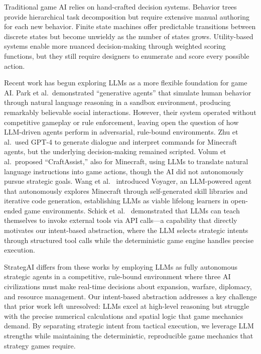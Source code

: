 \documentclass[conference]{IEEEtran}
\begin{document}
Traditional game AI relies on hand-crafted decision systems. Behavior trees provide hierarchical task decomposition but require extensive manual authoring for each new behavior. Finite state machines offer predictable transitions between discrete states but become unwieldy as the number of states grows. Utility-based systems enable more nuanced decision-making through weighted scoring functions, but they still require designers to enumerate and score every possible action.

Recent work has begun exploring LLMs as a more flexible foundation for game AI. Park et al.\ demonstrated ``generative agents'' that simulate human behavior through natural language reasoning in a sandbox environment, producing remarkably believable social interactions. However, their system operated without competitive gameplay or rule enforcement, leaving open the question of how LLM-driven agents perform in adversarial, rule-bound environments. Zhu et al.\ used GPT-4 to generate dialogue and interpret commands for Minecraft agents, but the underlying decision-making remained scripted. Volum et al.\ proposed ``CraftAssist,'' also for Minecraft, using LLMs to translate natural language instructions into game actions, though the AI did not autonomously pursue strategic goals. Wang et al.~\cite{wang2023voyager} introduced Voyager, an LLM-powered agent that autonomously explores Minecraft through self-generated skill libraries and iterative code generation, establishing LLMs as viable lifelong learners in open-ended game environments. Schick et al.~\cite{schick2023toolformer} demonstrated that LLMs can teach themselves to invoke external tools via API calls---a capability that directly motivates our intent-based abstraction, where the LLM selects strategic intents through structured tool calls while the deterministic game engine handles precise execution.

StrategAI differs from these works by employing LLMs as fully autonomous strategic agents in a competitive, rule-bound environment where three AI civilizations must make real-time decisions about expansion, warfare, diplomacy, and resource management. Our intent-based abstraction addresses a key challenge that prior work left unresolved: LLMs excel at high-level reasoning but struggle with the precise numerical calculations and spatial logic that game mechanics demand. By separating strategic intent from tactical execution, we leverage LLM strengths while maintaining the deterministic, reproducible game mechanics that strategy games require.
\end{document}
